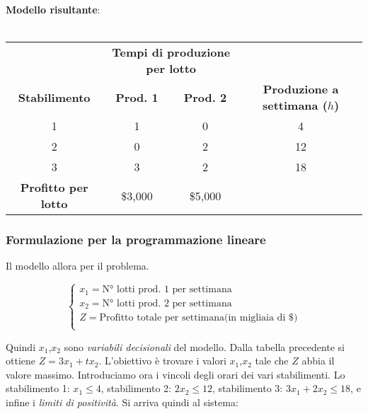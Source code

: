 \documentclass{article}
\begin{document}
\begin{tcolorbox}[
    colback=lightgray,
    colframe=black,
    coltext=black,
    title=Problema di PL Schiopparelli \& Co,
    colbacktitle=black,
    coltitle=lightgray,
    breakable
  ]
  \textbf{Modello risultante}: \\ \\
  \begin{tabular}{cccc}
    \toprule
                                & \multicolumn{2}{c}{\textbf{Tempi di produzione per lotto}} &                                                                          \\
    \cmidrule(lr){2-3}
    \textbf{Stabilimento}       & \textbf{Prod. 1}                                           & \textbf{Prod. 2} & \parbox{1.5in}{\textbf{Produzione a settimana ($h$)}} \\
                               & 1                                                          & 0                & 4                                                     \\
    2                           & 0                                                          & 2                & 12                                                    \\
    3                           & 3                                                          & 2                & 18                                                    \\
    \midrule
    \textbf{Profitto per lotto} & \$3,000                                                    & \$5,000          &                                                       \\
    \bottomrule
  \end{tabular}
\end{tcolorbox}

\subsubsection{Formulazione per la programmazione lineare}
Il modello allora per il problema.

$$
  \begin{cases}
    x_1 = \text{N° lotti prod. 1 per settimana}                 \\
    x_2 = \text{N° lotti prod. 2 per settimana}                 \\
    Z = \text{Profitto totale per settimana(in migliaia di \$)} \\
  \end{cases}
$$

Quindi $x_1$,$x_2$ sono \textit{variabili decisionali} del modello. Dalla tabella precedente si ottiene $Z = 3x_1+tx_2$. L'obiettivo è trovare i valori $x_1$,$x_2$ tale che $Z$ abbia il valore massimo. Introduciamo ora i vincoli degli orari dei vari stabilimenti. Lo stabilimento 1: $x_1\le4$, stabilimento 2: $2x_2\le12$, stabilimento 3: $3x_1+2x_2\le18$, e infine i \textit{limiti di positività}. Si arriva quindi al sistema:
\end{document}
